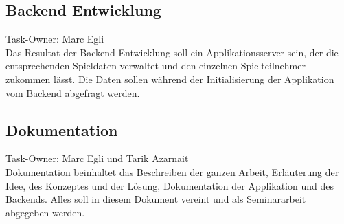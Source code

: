 \subsection{Backend Entwicklung} %
\label{sub:backend_entwicklung}
Task-Owner: Marc Egli\\
Das Resultat der Backend Entwicklung soll ein Applikationsserver sein, der die entsprechenden Spieldaten verwaltet und den einzelnen Spielteilnehmer zukommen lässt. Die Daten sollen während der Initialisierung der Applikation vom Backend abgefragt werden.

\subsection{Dokumentation} %
\label{sub:dokumentation}
Task-Owner: Marc Egli und Tarik Azarnait\\
Dokumentation beinhaltet das Beschreiben der ganzen Arbeit, Erläuterung der Idee, des Konzeptes und der Lösung, Dokumentation der Applikation und des Backends. Alles soll in diesem Dokument vereint und als Seminararbeit abgegeben werden. 

